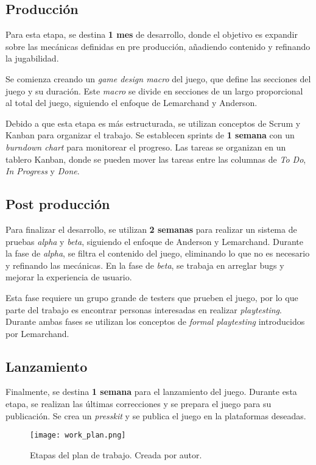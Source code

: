 \subsection{Producción}
%
\par Para esta etapa, se destina \textbf{1 mes} de desarrollo, donde el objetivo es expandir sobre las mecánicas definidas en pre producción, añadiendo contenido y refinando la jugabilidad.
\par Se comienza creando un \textit{game design macro} del juego, que define las secciones del juego y su duración. Este \textit{macro} se divide en secciones de un largo proporcional al total del juego, siguiendo el enfoque de Lemarchand y Anderson.
\par Debido a que esta etapa es más estructurada, se utilizan conceptos de Scrum y Kanban para organizar el trabajo. Se establecen sprints de \textbf{1 semana} con un \textit{burndown chart} para monitorear el progreso. Las tareas se organizan en un tablero Kanban, donde se pueden mover las tareas entre las columnas de \textit{To Do}, \textit{In Progress} y \textit{Done}.
%
%
\subsection{Post producción}
%
\par Para finalizar el desarrollo, se utilizan \textbf{2 semanas} para realizar un sistema de pruebas \textit{alpha} y \textit{beta}, siguiendo el enfoque de Anderson y Lemarchand. Durante la fase de \textit{alpha}, se filtra el contenido del juego, eliminando lo que no es necesario y refinando las mecánicas. En la fase de \textit{beta}, se trabaja en arreglar bugs y mejorar la experiencia de usuario.
\par Esta fase requiere un grupo grande de testers que prueben el juego, por lo que parte del trabajo es encontrar personas interesadas en realizar \textit{playtesting}. Durante ambas fases se utilizan los conceptos de \textit{formal playtesting} introducidos por Lemarchand.
%
%
\subsection{Lanzamiento}
\par Finalmente, se destina \textbf{1 semana} para el lanzamiento del juego. Durante esta etapa, se realizan las últimas correcciones y se prepara el juego para su publicación. Se crea un \textit{presskit} y se publica el juego en la plataformas deseadas. 

%
\begin{figure}[H]
  \centering
  \texttt{[image: work\_plan.png]}
  \caption{Etapas del plan de trabajo. Creada por autor.}
  \label{fig:x plan de trabajo} 
\end{figure}
%